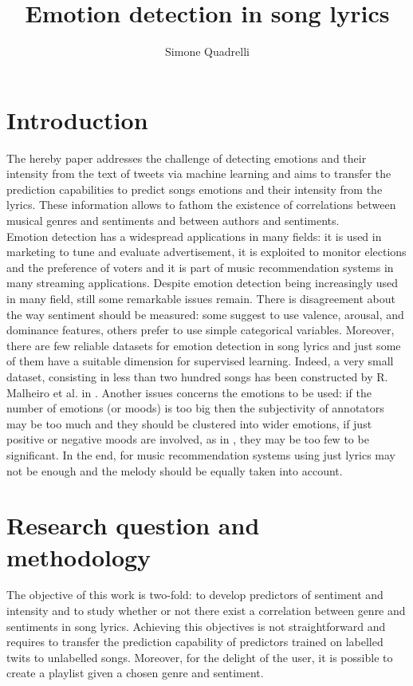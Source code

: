 \documentclass[runningheads]{llncs}
\begin{document}
\title{Emotion detection in song lyrics}


\author{Simone Quadrelli}


\maketitle            

\section{Introduction}
The hereby paper addresses the challenge of detecting emotions and their intensity from the text of tweets via machine learning and aims to transfer the prediction capabilities to predict songs emotions and their intensity from the lyrics. These information allows to fathom the existence of correlations between musical genres and sentiments and between authors and sentiments.\\

Emotion detection has a widespread applications in many fields: it is used in marketing to tune and evaluate advertisement, it is exploited to monitor elections and the preference of voters and it is part of music recommendation systems in many streaming applications. 
Despite emotion detection being increasingly used in many field, still some remarkable issues remain. There is disagreement about the way sentiment should be measured: some suggest to use valence, arousal, and dominance features, others prefer to use simple categorical variables. Moreover, there are few reliable datasets for emotion detection in song lyrics and just some of them have a suitable dimension for supervised learning. Indeed, a very small dataset, consisting in less than two hundred songs has been constructed by R. Malheiro et al. in \cite{musicmood}. Another issues concerns the emotions to be used: if the number of emotions (or moods) is too big then the subjectivity of annotators may be too much and they should be clustered into wider emotions, if just positive or negative moods are involved, as in \cite{musicmood1}, they may be too few to be significant. In the end, for music recommendation systems using just lyrics may not be enough and the melody should be equally taken into account. \\



\section{Research question and methodology}
The objective of this work is two-fold: to develop predictors of sentiment and intensity and to study whether or not there exist a correlation between genre and sentiments in song lyrics. Achieving this objectives is not straightforward and requires to transfer the prediction capability of predictors trained on labelled twits to unlabelled songs. Moreover, for the delight of the user, it is possible to create a playlist given a chosen genre and sentiment. \\
\end{document}
